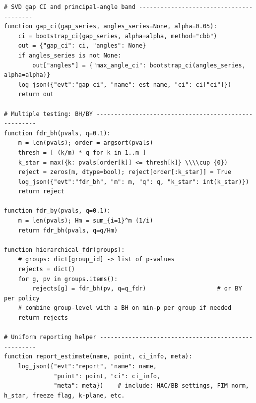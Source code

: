 \begin{lstlisting}
# SVD gap CI and principal-angle band ----------------------------------------
function gap_ci(gap_series, angles_series=None, alpha=0.05):
    ci = bootstrap_ci(gap_series, alpha=alpha, method="cbb")
    out = {"gap_ci": ci, "angles": None}
    if angles_series is not None:
        out["angles"] = {"max_angle_ci": bootstrap_ci(angles_series, alpha=alpha)}
    log_json({"evt":"gap_ci", "name": est_name, "ci": ci["ci"]})
    return out

# Multiple testing: BH/BY -----------------------------------------------------
function fdr_bh(pvals, q=0.1):
    m = len(pvals); order = argsort(pvals)
    thresh = [ (k/m) * q for k in 1..m ]
    k_star = max({k: pvals[order[k]] <= thresh[k]} \\\\cup {0})
    reject = zeros(m, dtype=bool); reject[order[:k_star]] = True
    log_json({"evt":"fdr_bh", "m": m, "q": q, "k_star": int(k_star)})
    return reject

function fdr_by(pvals, q=0.1):
    m = len(pvals); Hm = sum_{i=1}^m (1/i)
    return fdr_bh(pvals, q=q/Hm)

function hierarchical_fdr(groups):
    # groups: dict[group_id] -> list of p-values
    rejects = dict()
    for g, pv in groups.items():
        rejects[g] = fdr_bh(pv, q=q_fdr)                    # or BY per policy
    # combine group-level with a BH on min-p per group if needed
    return rejects

# Uniform reporting helper ----------------------------------------------------
function report_estimate(name, point, ci_info, meta):
    log_json({"evt":"report", "name": name,
              "point": point, "ci": ci_info,
              "meta": meta})    # include: HAC/BB settings, FIM norm, h_star, freeze flag, k-plane, etc.

\end{lstlisting}


